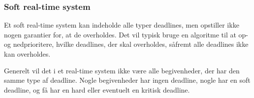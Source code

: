 \subsubsection{Soft real-time system}
Et soft real-time system kan indeholde alle typer deadlines, men opstiller ikke nogen garantier for, at de overholdes. Det vil typisk bruge en algoritme til at op- og nedprioritere, hvilke deadlines, der skal overholdes, såfremt alle deadlines ikke kan overholdes.

Generelt vil det i et real-time system ikke være alle begivenheder, der har den samme type af deadline. Nogle begivenheder har ingen deadline, nogle har en soft deadline, og få har en hard eller eventuelt en kritisk deadline. 
 








